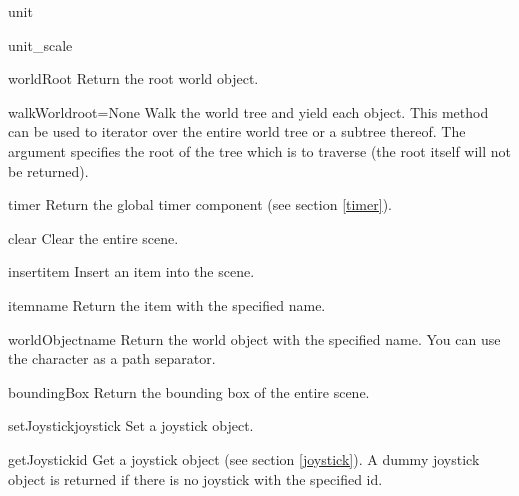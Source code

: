 \begin{memberdesc}{unit}
\end{memberdesc}

\begin{memberdesc}{unit_scale}
\end{memberdesc}

\begin{methoddesc}{worldRoot}{}
Return the root world object.
\end{methoddesc}

\begin{methoddesc}{walkWorld}{root=None}
Walk the world tree and yield each object. This method can be used to
iterator over the entire world tree or a subtree thereof. The argument 
 specifies the root of the tree which is to traverse (the 
root itself will not be returned).
\end{methoddesc}

\begin{methoddesc}{timer}{}
Return the global timer component (see section \ref{timer}).
\end{methoddesc}

\begin{methoddesc}{clear}{}
Clear the entire scene.
\end{methoddesc}

\begin{methoddesc}{insert}{item}
Insert an item into the scene.
\end{methoddesc}

\begin{methoddesc}{item}{name}
Return the item with the specified name.
\end{methoddesc}

\begin{methoddesc}{worldObject}{name}
Return the world object with the specified name. You can use the character
\character{|} as a path separator.
\end{methoddesc}

\begin{methoddesc}{boundingBox}{}
Return the bounding box of the entire scene.
\end{methoddesc}

\begin{methoddesc}{setJoystick}{joystick}
Set a joystick object.
\end{methoddesc}

\begin{methoddesc}{getJoystick}{id}
Get a joystick object (see section \ref{joystick}). A dummy joystick object is
returned if there is no joystick with the specified id.
\end{methoddesc}

